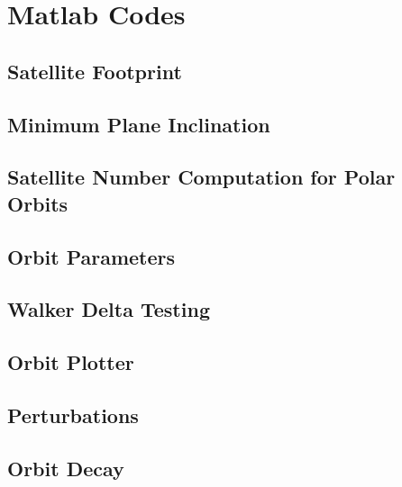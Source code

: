 \chapter{Matlab Codes}
\section{Satellite Footprint}
\label{SatFootprint}


\section{Minimum Plane Inclination}
\label{MinimumInclination}


\section{Satellite Number Computation for Polar Orbits}
\label{SatNumberPolar}


\section{Orbit Parameters}
\label{OrbitParameters}




\section{Walker Delta Testing}
\label{smartWD}


\section{Orbit Plotter}
\label{OrbitPlotter}






\section{Perturbations}
\label{Perturbation}



\section{Orbit Decay}
\label{OrbitDecay}



